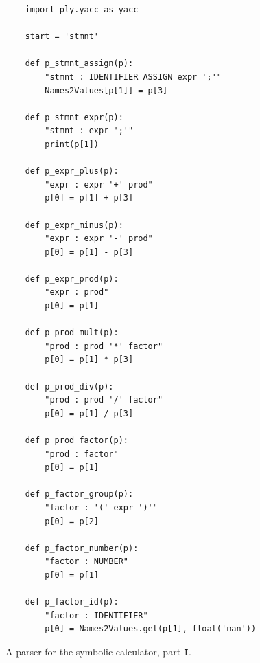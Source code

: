 \begin{figure}[!ht]
\centering
\begin{verbatim}
    import ply.yacc as yacc
    
    start = 'stmnt'
    
    def p_stmnt_assign(p):
        "stmnt : IDENTIFIER ASSIGN expr ';'"
        Names2Values[p[1]] = p[3]
    
    def p_stmnt_expr(p):
        "stmnt : expr ';'"
        print(p[1])
    
    def p_expr_plus(p):
        "expr : expr '+' prod"
        p[0] = p[1] + p[3]
        
    def p_expr_minus(p):
        "expr : expr '-' prod"
        p[0] = p[1] - p[3]
        
    def p_expr_prod(p):
        "expr : prod"
        p[0] = p[1]
    
    def p_prod_mult(p):
        "prod : prod '*' factor"
        p[0] = p[1] * p[3]
        
    def p_prod_div(p):
        "prod : prod '/' factor"
        p[0] = p[1] / p[3]
        
    def p_prod_factor(p):
        "prod : factor"
        p[0] = p[1]
    
    def p_factor_group(p):
        "factor : '(' expr ')'"
        p[0] = p[2]
    
    def p_factor_number(p):
        "factor : NUMBER"
        p[0] = p[1]
    
    def p_factor_id(p):
        "factor : IDENTIFIER"
        p[0] = Names2Values.get(p[1], float('nan'))
\end{verbatim}
\vspace*{-0.3cm}
\caption{A parser for the symbolic calculator, part \texttt{I}.}
\label{fig:Symbolic-Calculator.ipynb:yacc}
\end{figure}

